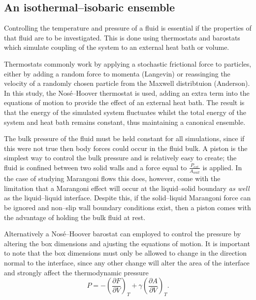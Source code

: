 \subsection{An isothermal--isobaric ensemble}
Controlling the temperature and pressure of a fluid is essential if the properties of that fluid are to be investigated.
This is done using thermostats and barostats which simulate coupling of the system to an external heat bath or volume.

Thermostats commonly work by applying a stochastic frictional force to particles, either by adding a random force to momenta (Langevin)\cite{Langevin} or reassinging the velocity of a randomly chosen particle from the Maxwell distribtuion (Anderson)\cite{AndersonTherm}.
In this study, the Nos\'{e}--Hoover thermostat is used,  adding an extra term into the equations of motion to provide the effect of an external heat bath.\cite{NoseHoover1, NoseHoover2, NoseHoover3}
The result is that the energy of the simulated system fluctuates whilst the total energy of the system and heat bath remains constant, thus maintaining a canonical ensemble.

The bulk pressure of the fluid must be held constant for all simulations, since if this were not true then body forces could occur in the fluid bulk.
A piston is the simplest way to control the bulk pressure and is relatively easy to create; the fluid is confined between two solid walls and a force equal to $\frac{P_{ext}}{A_{wall}}$ is applied.
In the case of studying Marangoni flows this does, however, come with the limitation that a Marangoni effect will occur at the liquid--solid boundary \textit{as well} as the liquid--liquid interface.
Despite this, if the solid--liquid Marangoni force can be ignored and non--slip wall boundary conditions exist, then a piston comes with the advantage of holding the bulk fluid at rest.

Alternatively a Nos\'{e}--Hoover barostat can employed to control the pressure by altering the box dimensions and ajusting the equations of motion. \cite{NoseHoover1, NoseHoover2, NoseHoover3}
It is important to note that the box dimensions must only be allowed to change in the direction normal to the interface, since any other change will alter the area of the interface and strongly affect the thermodynamic pressure
\begin{equation}
P = - \left( \frac{\partial F}{\partial V} \right)_{T} + \gamma \left( \frac{\partial A}{\partial V} \right)_{T}.
\end{equation}

